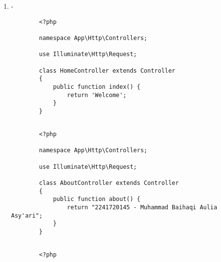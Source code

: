 \documentclass[12pt,titlepage]{article}
\begin{document}
\begin{enumerate}[label=\alph*.]
\begin{verbatim}
        Route::get('/about', [PageController::class, 'about']);

        Route::get('/articles/{id}', [PageController::class, 'articles']);

    \end{verbatim}

    \begin{verbatim}
        <?php

        namespace App\Http\Controllers;
        
        use Illuminate\Http\Request;
        
        class PageController extends Controller
        {
            public function index() {
                return 'Welcome';
            }
        
            public function about() {
                return "2241720145 - Muhammad Baihaqi Aulia Asy'ari";
            }
        
            public function articles($id) {
                return 'Article Page with ID ' . $id;
            }
        }

    \end{verbatim}

    \newpage

    \item -
    \begin{verbatim}
        <?php

        namespace App\Http\Controllers;
        
        use Illuminate\Http\Request;
        
        class HomeController extends Controller
        {
            public function index() {
                return 'Welcome';
            }
        }
        
    \end{verbatim}
    \begin{verbatim}
        <?php

        namespace App\Http\Controllers;
        
        use Illuminate\Http\Request;
        
        class AboutController extends Controller
        {
            public function about() {
                return "2241720145 - Muhammad Baihaqi Aulia Asy'ari";
            }
        }
        
    \end{verbatim}
    \begin{verbatim}
        <?php


\end{verbatim}
\end{enumerate}
\end{document}
